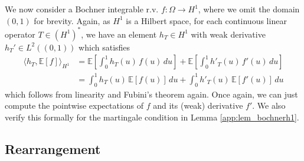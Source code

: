 \documentclass[11pt,a4paper]{article}
\newcommand{\E}{\mathbb{E}}
\begin{document}
\begin{appendices}
We now consider a Bochner integrable r.v. $f: \Omega \to H^1$, where we omit the domain $(0,1)$ for brevity. Again, as $H^1$ is a Hilbert space, for each continuous linear operator $T \in (H^1)^*$, we have an element $h_T \in H^1$ with weak derivative $h_T' \in L^2((0,1))$ which satisfies
\begin{align*}
    \langle h_T, \E[f]\rangle_{H^1} &= \E\left[\int_0^1 h_T(u)\, f(u)\,du\right] +  \E\left[\int_0^1 h'_T(u)\, f'(u)\, du\right] \\
    &=\int_0^1 h_T(u)\, \E[f(u)] \,du +  \int_0^1 h'_T(u)\, \E[f'(u)]\, du 
\end{align*}
which follows from linearity and Fubini's theorem again. Once again, we can just compute the pointwise expectations of $f$ and its (weak) derivative $f'$. We also verify this formally for the martingale condition in {Lemma \ref{app:lem_bochnerh1}}. 

\subsection{Rearrangement}

\end{appendices}
\end{document}
